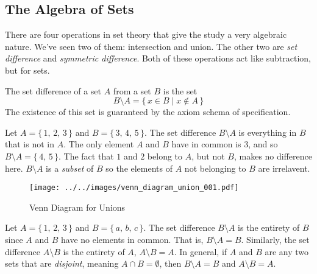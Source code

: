         \subsection{The Algebra of Sets}
            There are four operations in set theory that give the study a very
            algebraic nature. We've seen two of them: intersection and union.
            The other two are \textit{set difference} and
            \textit{symmetric difference}. Both of these operations act like
            subtraction, but for sets.
            \begin{definition}
                The set difference of a set $A$ from a set $B$ is the set
                \begin{equation}
                    B\setminus{A}=\{\,x\in{B}\;|\;x\notin{A}\,\}
                \end{equation}
                The existence of this set is guaranteed by the axiom schema
                of specification.
            \end{definition}
            \begin{example}
                Let $A=\{\,1,\,2,\,3\,\}$ and $B=\{\,3,\,4,\,5\,\}$. The
                set difference $B\setminus{A}$ is everything in $B$ that is
                not in $A$. The only element $A$ and $B$ have in common is
                $3$, and so $B\setminus{A}=\{\,4,\,5\,\}$. The fact that
                $1$ and $2$ belong to $A$, but not $B$, makes no difference
                here. $B\setminus{A}$ is a \textit{subset} of $B$ so the
                elements of $A$ not belonging to $B$ are irrelavent.
            \end{example}
            \begin{figure}
                \centering
                \texttt{[image: ../../images/venn\_diagram\_union\_001.pdf]}
                \caption{Venn Diagram for Unions}
                \label{fig:venn_diagram_union_001}
            \end{figure}
            \begin{example}
                Let $A=\{\,1,\,2,\,3\,\}$ and $B=\{\,a,\,b,\,c\,\}$. The set
                difference $B\setminus{A}$ is the entirety of $B$ since $A$ and
                $B$ have no elements in common. That is,
                $B\setminus{A}=B$. Similarly, the set difference $A\setminus{B}$
                is the entirety of $A$, $A\setminus{B}=A$. In general, if $A$
                and $B$ are any two sets that are \textit{disjoint}, meaning
                $A\cap{B}=\emptyset$, then $B\setminus{A}=B$ and
                $A\setminus{B}=A$.
            \end{example}
